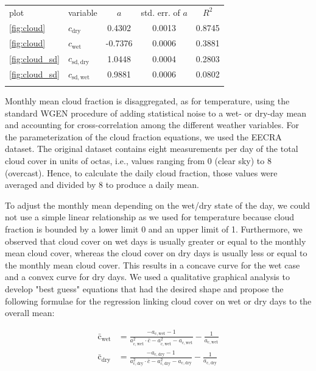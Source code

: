 \begin{refsection}
\begin{table}[t]
	\begin{tabular}{llccc}
		\tophline
		plot &                         variable &     $a$ & std. err. of $a$ &  $R^2$ \\
		\middlehline
		\ref{fig:cloud} &  $c_{\mathrm{dry}}$ & 0.4302 & 0.0013 & 0.8745 \\
		\ref{fig:cloud} &  $c_{\mathrm{wet}}$ & -0.7376 & 0.0006 & 0.3881 \\
		\ref{fig:cloud_sd} &  $c_{\mathrm{sd}, \mathrm{dry}}$ & 1.0448 & 0.0004 & 0.2803 \\
		\ref{fig:cloud_sd} &  $c_{\mathrm{sd}, \mathrm{wet}}$ & 0.9881 & 0.0006 & 0.0802 \\
		\bottomhline
	\end{tabular}
\end{table}

Monthly mean cloud fraction is disaggregated, as for temperature, using the standard WGEN procedure of adding statistical noise to a wet- or dry-day mean and accounting for cross-correlation among the different weather variables. For the parameterization of the cloud fraction equations, we used the EECRA dataset. The original dataset contains eight measurements per day of the total cloud cover in units of octas, i.e., values ranging from 0 (clear sky) to 8 (overcast). Hence, to calculate the daily cloud fraction, those values were averaged and divided by 8 to produce a daily mean.

To adjust the monthly mean depending on the wet/dry state of the day, we could not use a simple linear relationship as we used for temperature because cloud fraction is bounded by a lower limit 0 and an upper limit of 1. Furthermore, we observed that cloud cover on wet days is usually greater or equal to the monthly mean cloud cover, whereas the cloud cover on dry days is usually less or equal to the monthly mean cloud cover. This results in a concave curve for the wet case and a convex curve for dry days. We used a qualitative graphical analysis to develop "best guess" equations that had the desired shape and propose the following formulae for the regression linking cloud cover on wet or dry days to the overall mean:

\begin{align}
\bar{\mathrm{c}}_\mathrm{wet} &= \frac{-a_{\mathrm{c}, \mathrm{wet}} - 1}{a_{\mathrm{c}, \mathrm{wet}}^2 \cdot \bar{c} - a_{\mathrm{c}, \mathrm{wet}}^2 - a_{\mathrm{c}, \mathrm{wet}}}  - \frac{1}{a_{\mathrm{c}, \mathrm{wet}}} \nonumber \\
\bar{\mathrm{c}}_\mathrm{dry} &= \frac{-a_{\mathrm{c}, \mathrm{dry}} - 1}{a_{\mathrm{c}, \mathrm{dry}}^2 \cdot \bar{c} - a_{\mathrm{c}, \mathrm{dry}}^2 - a_{\mathrm{c}, \mathrm{dry}}}  - \frac{1}{a_{\mathrm{c}, \mathrm{dry}}}
\label{eq:cloud_mean}
\end{align}


\end{refsection}
